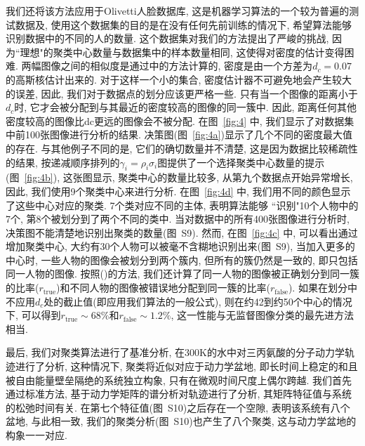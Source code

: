 我们还将该方法应用于Olivetti人脸数据库\cite{Samaria1994}, 这是机器学习算法的一个较为普遍的测试数据及, 使用这个数据集的目的是在没有任何先前训练的情况下, 希望算法能够识别数据中的不同的人的数量. 这个数据集对我们的方法提出了严峻的挑战, 因为``理想"的聚类中心数量与数据集中的样本数量相同, 这使得对密度的估计变得困难. 两幅图像之间的相似度是通过\cite{Sampat2009}中的方法计算的, 密度是由一个方差为$d_c=0.07$的高斯核\cite{Cheng1995}估计出来的. 对于这样一个小的集合, 密度估计器不可避免地会产生较大的误差, 因此, 我们对于数据点的划分应该更严格一些. 只有当一个图像的距离小于$d_c$时, 它才会被分配到与其最近的密度较高的图像的同一簇中. 因此, 距离任何其他密度较高的图像比dc更远的图像会不被分配. 在图~\ref{fig:4} 中, 我们显示了对数据集中前100张图像进行分析的结果. 决策图(图~\ref{fig:4a})显示了几个不同的密度最大值的存在. 与其他例子不同的是, 它们的确切数量并不清楚, 这是因为数据比较稀疏性的结果, 按递减顺序排列的$\gamma_i = \rho_i\sigma_i$图提供了一个选择聚类中心数量的提示(图~\ref{fig:4b}), 这张图显示, 聚类中心的数量比较多, 从第九个数据点开始异常增长, 因此, 我们使用9个聚类中心来进行分析. 在图~\ref{fig:4d} 中, 我们用不同的颜色显示了这些中心对应的聚类. 7个类对应不同的主体, 表明算法能够 ``识别"10个人物中的7个, 第8个被划分到了两个不同的类中. 当对数据中的所有400张图像进行分析时, 决策图不能清楚地识别出聚类的数量(图~S9). 然而, 在图~\ref{fig:4c} 中, 可以看出通过增加聚类中心, 大约有30个人物可以被毫不含糊地识别出来(图~S9), 当加入更多的中心时, 一些人物的图像会被划分到两个簇内, 但所有的簇仍然是一致的, 即只包括同一人物的图像. 按照\citeauthor{Dueck2007}(\citeyear{Dueck2007})的方法, 我们还计算了同一人物的图像被正确划分到同一簇的比率($r_{\mathrm{true}}$)和不同人物的图像被错误地分配到同一簇的比率($r_{\mathrm{false}}$). 如果在划分中不应用$d_c$处的截止值(即应用我们算法的一般公式), 则在约42到约50个中心的情况下, 可以得到$r_{\mathrm{true}}\sim 68\%$和$r_{\mathrm{false}}\sim 1.2\%$, 这一性能与无监督图像分类的最先进方法相当\cite{Dueck2007}. 

最后, 我们对聚类算法进行了基准分析, 在300K的水\cite{Marinelli2009}中对三丙氨酸的分子动力学轨迹进行了分析, 这种情况下, 聚类将近似对应于动力学盆地, 即长时间上稳定的和且被自由能量壁垒隔绝的系统独立构象, 只有在微观时间尺度上偶尔跨越. 我们首先通过标准方法\cite{Horenko2006}, 基于动力学矩阵的谱分析对轨迹进行了分析, 其矩阵特征值与系统的松弛时间有关. 在第七个特征值(图~S10)之后存在一个空隙, 表明该系统有八个盆地, 与此相一致, 我们的聚类分析(图~S10)也产生了八个聚类, 这与动力学盆地的构象一一对应\cite{Horenko2006}. 

